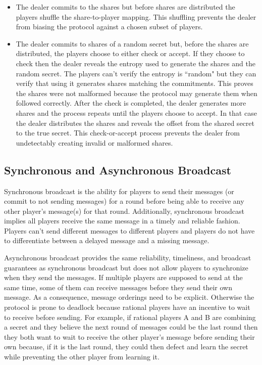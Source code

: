 \documentclass{dalcsthesis}
\begin{document}
\begin{itemize}
  \item The dealer commits to the shares but before shares are distributed the players shuffle the share-to-player mapping. This shuffling prevents the dealer from biasing the protocol against a chosen subset of players.  
  \item The dealer commits to shares of a random secret but, before the shares are distributed, the players choose to either check or accept. If they choose to check then the dealer reveals the entropy used to generate the shares and the random secret. The players can't verify the entropy is ``random" but they can verify that using it generates shares matching the commitments. This proves the shares were not malformed because the protocol may generate them when followed correctly. After the check is completed, the dealer generates more shares and the process repeats until the players choose to accept. In that case the dealer distributes the shares and reveals the offset from the shared secret to the true secret. This check-or-accept process prevents the dealer from undetectably creating invalid or malformed shares.
\end{itemize} 

\subsection{Synchronous and Asynchronous Broadcast}

Synchronous broadcast is the ability for players to send their messages (or commit to not sending messages) for a round before being able to receive any other player's message(s) for that round. Additionally, synchronous broadcast implies all players receive the same message in a timely and reliable fashion. Players can't send different messages to different players and players do not have to differentiate between a delayed message and a missing message. 

Asynchronous broadcast provides the same reliability, timeliness, and broadcast guarantees as synchronous broadcast but does not allow players to synchronize when they send the messages. If multiple players are supposed to send at the same time, some of them can receive messages before they send their own message. As a consequence, message orderings need to be explicit. Otherwise the protocol is prone to deadlock because rational players have an incentive to wait to receive before sending. For example, if rational players A and B are combining a secret and they believe the next round of messages could be the last round then they both want to wait to receive the other player's message before sending their own because, if it is the last round, they could then defect and learn the secret while preventing the other player from learning it. 
\end{document}
